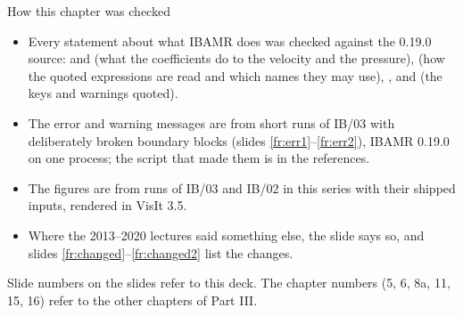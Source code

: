 \documentclass[aspectratio=169,11pt]{beamer}
\begin{document}
\begin{frame}{How this chapter was checked}
\label{fr:checked}
\begin{itemize}
  \item Every statement about what IBAMR does was checked against the 0.19.0 source:  and  (what the coefficients do to the velocity and the pressure),  (how the quoted expressions are read and which names they may use), ,  and  (the keys and warnings quoted).
  \item The error and warning messages are from short runs of IB/03 with deliberately broken boundary blocks (slides \ref{fr:err1}--\ref{fr:err2}), IBAMR 0.19.0 on one process; the script that made them is in the references.
  \item The figures are from runs of IB/03 and IB/02 in this series with their shipped inputs, rendered in VisIt 3.5.
  \item Where the 2013--2020 lectures said something else, the slide says so, and slides \ref{fr:changed}--\ref{fr:changed2} list the changes.
\end{itemize}
\begin{punchbox}
\small Slide numbers on the slides refer to this deck. The chapter numbers (5, 6, 8a, 11, 15, 16) refer to the other chapters of Part III.
\end{punchbox}
\end{frame}
\end{document}
